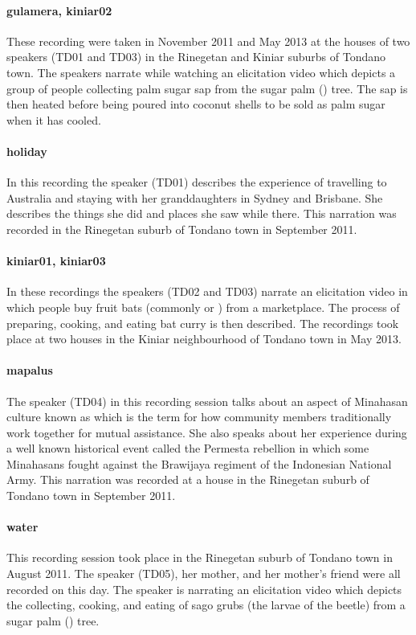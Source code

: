 \paragraph{gulamera, kiniar02}
These recording were taken in November 2011 and May 2013 at the houses of two speakers (TD01 and TD03) in the Rinegetan and Kiniar suburbs of Tondano town. The speakers narrate while watching an elicitation video which depicts a group of people collecting palm sugar sap from the sugar palm () tree. The sap is then heated before being poured into coconut shells to be sold as palm sugar when it has cooled.

\paragraph{holiday}
In this recording the speaker (TD01) describes the experience of travelling to Australia and staying with her granddaughters in Sydney and Brisbane. She describes the things she did and places she saw while there. This narration was recorded in the Rinegetan suburb of Tondano town in September 2011.

\paragraph{kiniar01, kiniar03}
In these recordings the speakers (TD02 and TD03) narrate an elicitation video in which people buy fruit bats (commonly  or ) from a marketplace. The process of preparing, cooking, and eating bat curry is then described. The recordings took place at two houses in the Kiniar neighbourhood of Tondano town in May 2013.

\paragraph{mapalus}
The speaker (TD04) in this recording session talks about an aspect of Minahasan culture known as  which is the term for how community members traditionally work together for mutual assistance. She also speaks about her experience during a well known historical event called the Permesta rebellion in which some Minahasans fought against the Brawijaya regiment of the Indonesian National Army. This narration was recorded at a house in the Rinegetan suburb of Tondano town in September 2011.

\paragraph{water}
This recording session took place in the Rinegetan suburb of Tondano town in August 2011. The speaker (TD05), her mother, and her mother’s friend were all recorded on this day. The speaker is narrating an elicitation video which depicts the collecting, cooking, and eating of sago grubs (the larvae of the  beetle) from a sugar palm () tree.

